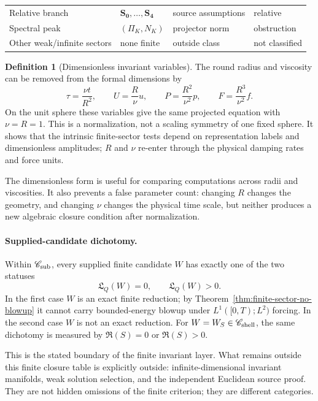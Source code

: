 \documentclass[aps,prd,reprint,superscriptaddress,nofootinbib,floatfix]{revtex4-2}
\theoremstyle{definition}
\newtheorem{definition}[theorem]{Definition}
\theoremstyle{remark}
\begin{document}
\begin{table}[t]
\begin{tabular}{llll}
		Relative branch             & \(\mathbf{S_0},\ldots,\mathbf{S_4}\) & source assumptions                     & relative                             \\
		Spectral peak               & \((\Pi_K,N_K)\)                      & projector norm                         & obstruction                          \\
		Other weak/infinite sectors & none finite                          & outside class                          & not classified                       \\
		\bottomrule
	\end{tabular}
\end{table}

\begin{definition}[Dimensionless invariant variables]
	The round radius and viscosity can be removed from the formal dimensions by
	\[
		\tau=\frac{\nu t}{R^2},\qquad
		U=\frac{R}{\nu}u,\qquad
		P=\frac{R^2}{\nu^2}p,\qquad
		F=\frac{R^3}{\nu^2}f .
	\]
	On the unit sphere these variables give the same projected equation with \(\nu=R=1\).  This is a normalization, not a scaling symmetry of one fixed sphere.  It shows that the intrinsic finite-sector tests depend on representation labels and dimensionless amplitudes; \(R\) and \(\nu\) re-enter through the physical damping rates and force units.
\end{definition}

The dimensionless form is useful for comparing computations across radii and viscosities.  It also prevents a false parameter count: changing \(R\) changes the geometry, and changing \(\nu\) changes the physical time scale, but neither produces a new algebraic closure condition after normalization.

\paragraph*{Supplied-candidate dichotomy.}
Within \(\mathscr C_{\rm sub}\), every supplied finite candidate \(W\) has exactly one of the two statuses
\[
	\mathfrak L_Q(W)=0,\qquad \mathfrak L_Q(W)>0 .
\]
In the first case \(W\) is an exact finite reduction; by Theorem~\ref{thm:finite-sector-no-blowup} it cannot carry bounded-energy blowup under \(L^1([0,T);L^2)\) forcing.  In the second case \(W\) is not an exact reduction.  For \(W=W_S\in\mathscr C_{\rm shell}\), the same dichotomy is measured by \(\mathfrak R(S)=0\) or \(\mathfrak R(S)>0\).


This is the stated boundary of the finite invariant layer.  What remains outside this finite closure table is explicitly outside: infinite-dimensional invariant manifolds, weak solution selection, and the independent Euclidean source proof.  They are not hidden omissions of the finite criterion; they are different categories.
\end{document}
